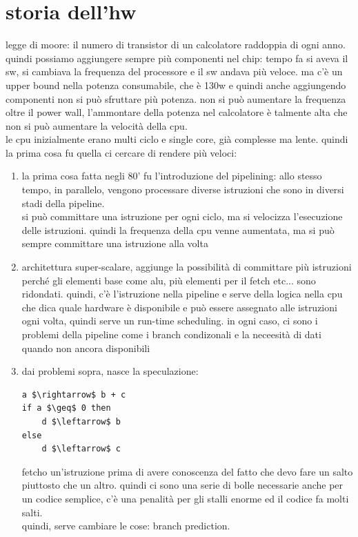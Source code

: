 \documentclass[12pt, oneside]{extbook} %
\begin{document}
\section{storia dell'hw}
legge di moore: il numero di transistor di un calcolatore raddoppia di ogni anno.\\ quindi possiamo aggiungere sempre più componenti nel chip: tempo fa si aveva il sw, si cambiava la frequenza del processore e il sw andava più veloce. ma c'è un upper bound nella potenza consumabile, che è 130w e quindi anche aggiungendo componenti non si può sfruttare più potenza. non si può aumentare la frequenza oltre il power wall, l'ammontare della potenza nel calcolatore è talmente alta che non si può aumentare la velocità della cpu.\\ le cpu inizialmente erano multi ciclo e single core, già complesse ma lente. quindi la prima cosa fu quella ci cercare di rendere più veloci:
\begin{enumerate}
\item la prima cosa fatta negli 80' fu l'introduzione del pipelining: allo stesso tempo, in parallelo, vengono processare diverse istruzioni che sono in diversi stadi della pipeline.\\ si può committare una istruzione per ogni ciclo, ma si velocizza l'esecuzione delle istruzioni. quindi la frequenza della cpu venne aumentata, ma si può sempre committare una istruzione alla volta
\item architettura super-scalare, aggiunge la possibilità di committare più istruzioni perché gli elementi base come alu, più elementi per il fetch etc... sono ridondati. quindi, c'è l'istruzione nella pipeline e serve della logica nella cpu che dica quale hardware è disponibile e può essere assegnato alle istruzioni ogni volta, quindi serve un run-time scheduling. in ogni caso, ci sono i problemi della pipeline come i branch condizonali e la neceesità di dati quando non ancora disponibili
\item dai problemi sopra, nasce la speculazione:
\begin{lstlisting}[mathescape=true]
a $\rightarrow$ b + c
if a $\geq$ 0 then
	d $\leftarrow$ b
else
	d $\leftarrow$ c
\end{lstlisting}
fetcho un'istruzione prima di avere conoscenza del fatto che devo fare un salto piuttosto che un altro. quindi ci sono una serie di bolle necessarie anche per un codice semplice, c'è una penalità per gli stalli enorme ed il codice fa molti salti.\\ quindi, serve cambiare le cose: branch prediction. 
\end{enumerate}
\end{document}
